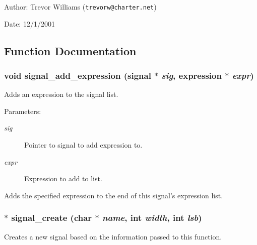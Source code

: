 \begin{Desc}
\item[Author:]Trevor Williams ({\tt trevorw@charter.net}) \end{Desc}
\begin{Desc}
\item[Date:]12/1/2001 \end{Desc}


\subsection{Function Documentation}
\subsubsection{\setlength{\rightskip}{0pt plus 5cm}void signal\_\-add\_\-expression ({\bf signal} $\ast$ {\em sig}, {\bf expression} $\ast$ {\em expr})}\label{signal_8h_a8}


Adds an expression to the signal list. 

\begin{Desc}
\item[Parameters:]
\begin{description}
\item[{\em sig}]Pointer to signal to add expression to. \item[{\em expr}]Expression to add to list.\end{description}
\end{Desc}
Adds the specified expression to the end of this signal's expression list. 
\subsubsection{$\ast$ signal\_\-create (char $\ast$ {\em name}, int {\em width}, int {\em lsb})}\label{signal_8h_a1}


Creates a new signal based on the information passed to this function. 

